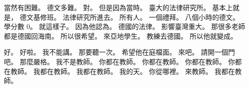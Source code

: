 \hypertarget{c01:cue:4116}{}當然有困難。
\hypertarget{c01:cue:4117}{}德文多難。
\hypertarget{c01:cue:4118}{}對。
\hypertarget{c01:cue:4119}{}但是因為當時。
\hypertarget{c01:cue:4120}{}臺大的法律研究所。
\hypertarget{c01:cue:4121}{}基本上就是，
\hypertarget{c01:cue:4122}{}德文基修班。
\hypertarget{c01:cue:4123}{}法律研究所進去。
\hypertarget{c01:cue:4124}{}所有人。
\hypertarget{c01:cue:4125}{}一個禮拜。
\hypertarget{c01:cue:4126}{}八個小時的德文。
\hypertarget{c01:cue:4127}{}學分數 0。
\hypertarget{c01:cue:4128}{}就這樣子。
\hypertarget{c01:cue:4129}{}因為他認為。
\hypertarget{c01:cue:4130}{}德國的法律。
\hypertarget{c01:cue:4131}{}影響臺灣重大。
\hypertarget{c01:cue:4132}{}那很多老師都是德國回海南。
\hypertarget{c01:cue:4133}{}所以很希望。
\hypertarget{c01:cue:4134}{}來亞地學生。
\hypertarget{c01:cue:4135}{}教練去德國。
\hypertarget{c01:cue:4136}{}所以他就變成。

\hypertarget{c01:cue:4137}{}好。
\hypertarget{c01:cue:4138}{}好啦。
\hypertarget{c01:cue:4139}{}我不能講。
\hypertarget{c01:cue:4140}{}那要聽一次。
\hypertarget{c01:cue:4141}{}希望他在庭檔面。
\hypertarget{c01:cue:4142}{}來吧。
\hypertarget{c01:cue:4143}{}請開一個門吧。
\hypertarget{c01:cue:4144}{}那麼嚴格。
\hypertarget{c01:cue:4145}{}我不是教師。
\hypertarget{c01:cue:4146}{}你都在教師。
\hypertarget{c01:cue:4147}{}你都在教師。
\hypertarget{c01:cue:4148}{}你都在教師。
\hypertarget{c01:cue:4149}{}你都在教師。
\hypertarget{c01:cue:4150}{}我都在教師。
\hypertarget{c01:cue:4151}{}我都在教師。
\hypertarget{c01:cue:4152}{}我的天。
\hypertarget{c01:cue:4153}{}你從哪裡。
\hypertarget{c01:cue:4154}{}來教師。
\hypertarget{c01:cue:4155}{}我都在教師。
